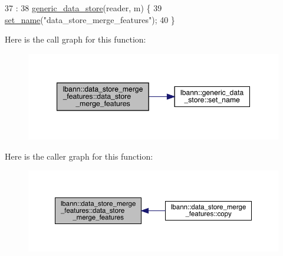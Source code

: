 \begin{DoxyCode}
37                                                                                           :
38     \hyperlink{classlbann_1_1generic__data__store_acbcd88161c06f4bb9a70bbae857d4ee0}{generic\_data\_store}(reader, m) \{
39   \hyperlink{classlbann_1_1generic__data__store_a853741295a07b5687921fc56d0d7d5b2}{set\_name}(\textcolor{stringliteral}{"data\_store\_merge\_features"});
40 \}
\end{DoxyCode}
Here is the call graph for this function\+:\nopagebreak
\begin{figure}[H]
\begin{center}
\leavevmode
\includegraphics[width=347pt]{classlbann_1_1data__store__merge__features_a4a2d9d0460f657a38397cf3a48c4d83e_cgraph}
\end{center}
\end{figure}
Here is the caller graph for this function\+:\nopagebreak
\begin{figure}[H]
\begin{center}
\leavevmode
\includegraphics[width=350pt]{classlbann_1_1data__store__merge__features_a4a2d9d0460f657a38397cf3a48c4d83e_icgraph}
\end{center}
\end{figure}
\mbox{\label{classlbann_1_1data__store__merge__features_af7b5c97c849f1d005ce738dacd53bd7a}} 
